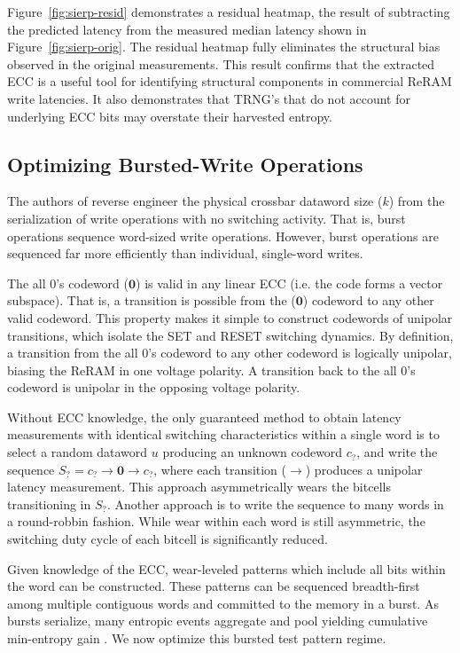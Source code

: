 Figure~\ref{fig:sierp-resid} demonstrates a residual heatmap, the result of subtracting the predicted latency from the measured median latency shown in Figure~\ref{fig:sierp-orig}. The residual heatmap fully eliminates the structural bias observed in the original measurements. This result confirms that the extracted ECC is a useful tool for identifying structural components in commercial ReRAM write latencies. It also demonstrates that TRNG's that do not account for underlying ECC bits may overstate their harvested entropy.



\subsection{Optimizing Bursted-Write Operations}

\label{sec:opt-burst}
The authors of \cite{sheaves2026brewrc} reverse engineer the physical crossbar dataword size ($k$) from the serialization of write operations with no switching activity. That is, burst operations sequence word-sized write operations. However, burst operations are sequenced far more efficiently than individual, single-word writes.

The all 0's codeword ($\mathbf{0}$) is valid in any linear ECC (i.e. the code forms a vector subspace). That is, a transition is possible from the ($\mathbf{0}$) codeword to any other valid codeword. This property makes it simple to construct codewords of unipolar transitions, which isolate the SET and RESET switching dynamics. By definition, a transition from the all 0's codeword to any other codeword is logically unipolar, biasing the ReRAM in one voltage polarity. A transition back to the all 0's codeword is unipolar in the opposing voltage polarity. 

Without ECC knowledge, the only guaranteed method to obtain latency measurements with identical switching characteristics within a single word is to select a random dataword $u$ producing an unknown codeword $c_?$, and write the sequence $S_? = c_? \rightarrow \mathbf{0} \rightarrow c_?$, where each transition ($\rightarrow$) produces a unipolar latency measurement. This approach asymmetrically wears the bitcells transitioning in $S_?$. Another approach is to write the sequence to many words in a round-robbin fashion. While wear within each word is still asymmetric, the switching duty cycle of each bitcell is significantly reduced.

Given knowledge of the ECC, wear-leveled patterns which include all bits within the word can be constructed. These patterns can be sequenced breadth-first among multiple contiguous words and committed to the memory in a burst. As bursts serialize, many entropic events aggregate and pool yielding cumulative min-entropy gain \cite{nist90b}. We now optimize this bursted test pattern regime. 

